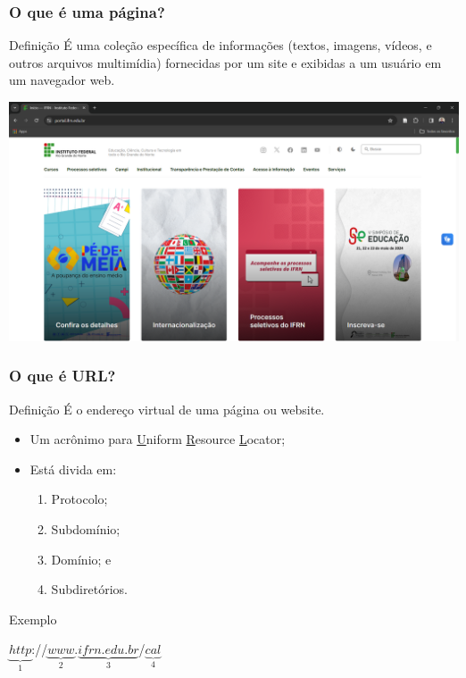 \documentclass[aspectratio=169]{beamer} %
\begin{document}
\begin{frame}
	\frametitle{O que é uma página?}
	
	\begin{block}{Defini\c cão}
		É uma coleção específica de informações (textos, imagens, vídeos, e outros arquivos multimídia) fornecidas por um site e exibidas a um usuário em um navegador web.
	\end{block} \vfill

	\begin{center}
		\includegraphics[scale=0.13]{img/pagina}
	\end{center}
\end{frame}

\begin{frame}
	\frametitle{O que é URL?}
	
	\begin{block}{Defini\c cão}
		É o endereço virtual de uma página ou website.
	\end{block} \vfill
	
	\begin{itemize}
		\item Um acrônimo para \underline{U}niform \underline{R}esource \underline{L}ocator;
		\item Está divida em: 
		\begin{enumerate}
			\item Protocolo; 
			\item Subdomínio;
			\item Domínio; e 
			\item Subdiretórios.
		\end{enumerate}				
	\end{itemize} \vfill
	
	\begin{exampleblock}{Exemplo}
		\begin{center}
			$\underbrace{http}_{1}$://$\underbrace{www}_{2}$.$\underbrace{ifrn.edu.br}_{3}$/$\underbrace{cal}_{4}$
		\end{center}
	\end{exampleblock}
\end{frame}
\end{document}
